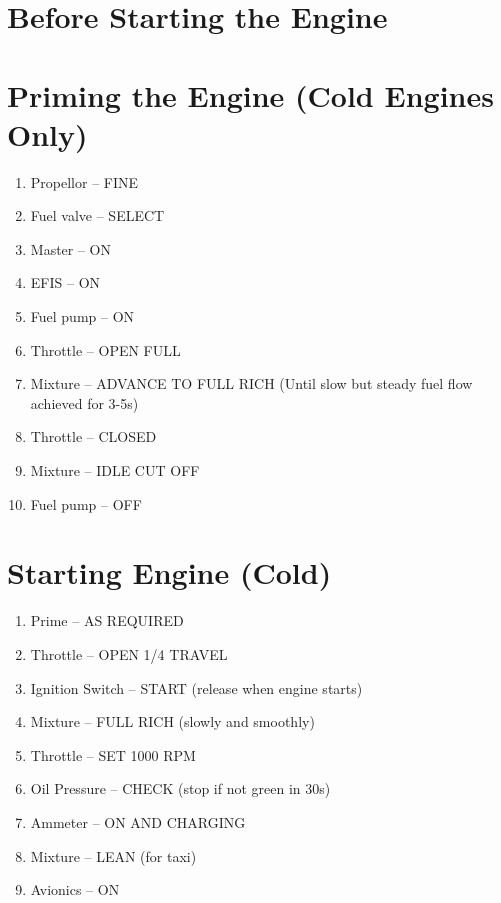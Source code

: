 \section{Before Starting the Engine}

\section{Priming the Engine (Cold Engines Only)}
\begin{enumerate}[(1)]
  \item Propellor -- FINE
  \item Fuel valve -- SELECT
  \item Master -- ON
  \item EFIS -- ON
  \item Fuel pump -- ON
  \item Throttle -- OPEN FULL
  \item Mixture -- ADVANCE TO FULL RICH (Until slow but steady fuel flow achieved for 3-5s)
  \item Throttle -- CLOSED
  \item Mixture -- IDLE CUT OFF
  \item Fuel pump -- OFF
\end{enumerate}

\section{Starting Engine (Cold)}
\begin{enumerate}[(1)]
  \item Prime -- AS REQUIRED
  \item Throttle -- OPEN 1/4 TRAVEL
  \item Ignition Switch -- START (release when engine starts)
  \item Mixture -- FULL RICH (slowly and smoothly)
  \item Throttle -- SET 1000 RPM
  \item Oil Pressure -- CHECK (stop if not green in 30s)
  \item Ammeter -- ON AND CHARGING
  \item Mixture -- LEAN (for taxi)
  \item Avionics -- ON 
\end{enumerate}

